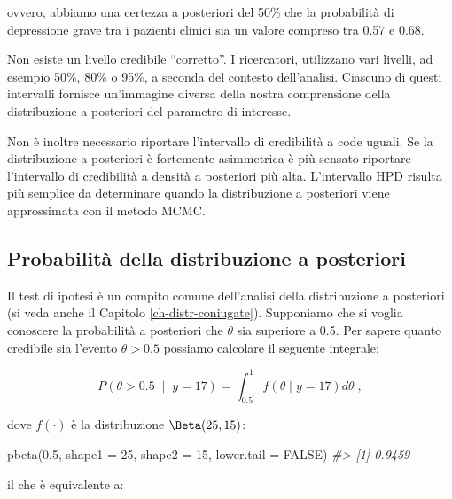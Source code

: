 \documentclass[
  11pt,
]{krantz}
\makeatletter
\newenvironment{Shaded}{\begin{snugshade}}{\end{snugshade}}
\newcommand{\AttributeTok}[1]{\textcolor[rgb]{0.61,0.61,0.61}{#1}}
\newcommand{\CommentTok}[1]{\textcolor[rgb]{0.37,0.37,0.37}{\textit{#1}}}
\newcommand{\ConstantTok}[1]{\textcolor[rgb]{0,0,0}{#1}}
\newcommand{\DecValTok}[1]{\textcolor[rgb]{0.06,0.06,0.06}{#1}}
\newcommand{\FloatTok}[1]{\textcolor[rgb]{0.06,0.06,0.06}{#1}}
\newcommand{\FunctionTok}[1]{\textcolor[rgb]{0,0,0}{#1}}
\newcommand{\NormalTok}[1]{#1}
\newenvironment{kframe}{%
\medskip{}
\setlength{\fboxsep}{.8em}
 \def\at@end@of@kframe{}%
 \ifinner\ifhmode%
  \def\at@end@of@kframe{\end{minipage}}%
  \begin{minipage}{\columnwidth}%
 \fi\fi%
 \def\FrameCommand##1{\hskip\@totalleftmargin \hskip-\fboxsep
 \colorbox{shadecolor}{##1}\hskip-\fboxsep
     \hskip-\linewidth \hskip-\@totalleftmargin \hskip\columnwidth}%
 \MakeFramed {\advance\hsize-\width
   \@totalleftmargin\z@ \linewidth\hsize
   \@setminipage}}%
 {\par\unskip\endMakeFramed%
 \at@end@of@kframe}
\renewenvironment{Shaded}{\begin{kframe}}{\end{kframe}}
\theoremstyle{definition}
\theoremstyle{definition}
\theoremstyle{definition}
\theoremstyle{definition}
\theoremstyle{remark}
\makeatother
\begin{document}
ovvero, abbiamo una certezza a posteriori del 50\% che la probabilità di depressione grave tra i pazienti clinici sia un valore compreso tra 0.57 e 0.68.

Non esiste un livello credibile ``corretto''. I ricercatori, utilizzano vari livelli, ad esempio 50\%, 80\% o 95\%, a seconda del contesto dell'analisi. Ciascuno di questi intervalli fornisce un'immagine diversa della nostra comprensione della distribuzione a posteriori del parametro di interesse.

Non è inoltre necessario riportare l'intervallo di credibilità a code uguali. Se la distribuzione a posteriori è fortemente asimmetrica è più sensato riportare l'intervallo di credibilità a densità a posteriori più alta. L'intervallo HPD risulta più semplice da determinare quando la distribuzione a posteriori viene approssimata con il metodo MCMC.

\hypertarget{probabilituxe0-della-distribuzione-a-posteriori}{%
\subsection{Probabilità della distribuzione a posteriori}\label{probabilituxe0-della-distribuzione-a-posteriori}}

Il test di ipotesi è un compito comune dell'analisi della distribuzione a posteriori (si veda anche il Capitolo \ref{ch-distr-coniugate}). Supponiamo che si voglia conoscere la probabilità a posteriori che \(\theta\) sia superiore a 0.5. Per sapere quanto credibile sia l'evento \(\theta > 0.5\) possiamo calcolare il seguente integrale:

\[
P(\theta > 0.5 \; \mid \; y = 17) = \int_{0.5}^{1}f(\theta \mid y=17)d\theta \;,
\]

dove \(f(\cdot)\) è la distribuzione \(\mbox{\Beta}(25, 15)\):

\begin{Shaded}
\begin{Highlighting}[]
\FunctionTok{pbeta}\NormalTok{(}\FloatTok{0.5}\NormalTok{, }\AttributeTok{shape1 =} \DecValTok{25}\NormalTok{, }\AttributeTok{shape2 =} \DecValTok{15}\NormalTok{, }\AttributeTok{lower.tail =} \ConstantTok{FALSE}\NormalTok{)}
\CommentTok{\#\textgreater{} [1] 0.9459}
\end{Highlighting}
\end{Shaded}

il che è equivalente a:
\end{document}
